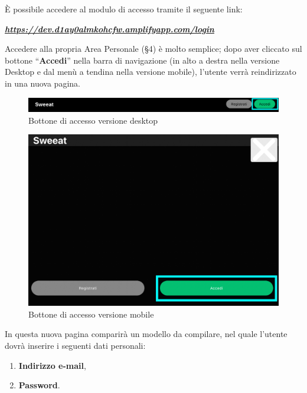 
È possibile accedere al modulo di accesso tramite il seguente link:

\begin{center}
\textsl{ \href{https://dev.d1ay0almkohcfw.amplifyapp.com/login}{\textbf{https://dev.d1ay0almkohcfw.amplifyapp.com/login} }}
\end{center}

Accedere alla propria Area Personale (\S{4}) è molto semplice; dopo aver cliccato sul bottone “\textbf{Accedi}” nella barra di navigazione (in alto a destra nella versione Desktop e dal menù a tendina nella versione mobile), l’utente verrà reindirizzato in una nuova pagina.

\begin{figure}[H]
\centering
\includegraphics[scale=0.15]{./images/Login/LoginDesktop.png} 
\caption{Bottone di accesso versione desktop}
\end{figure}

\begin{figure}[H]
\centering
\includegraphics[scale=0.2]{./images/Login/LoginMobile.png} 
\caption{Bottone di accesso versione mobile}
\end{figure}

In questa nuova pagina comparirà un modello da compilare, nel quale l’utente dovrà inserire i seguenti dati personali:

\begin{enumerate}
\item \textbf{Indirizzo e-mail},
\item \textbf{Password}.
\end{enumerate}


